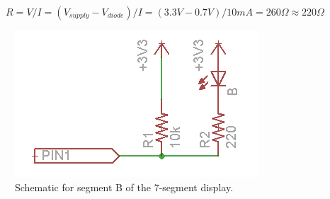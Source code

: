 \documentclass[11pt]{article}
\begin{document}
\begin{equation}
\label{eq:resistor}
R = V/I
  = (V_{supply}-V_{diode})/I
  = (3.3V - 0.7V)/10mA
  = 260\Omega
 \approx 220\Omega
\end{equation} 
		
\begin{figure}[h!]
\centering
\includegraphics[scale=0.7]{single_led.png}
\caption{Schematic for segment B of the 7-segment display.}
\label{figure:single_led}
\end{figure} 
\end{document}
